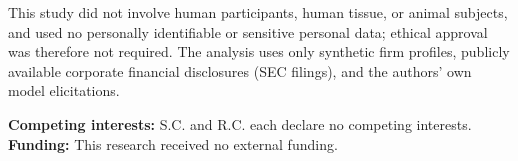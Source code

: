 \documentclass[pdflatex,sn-nature,lineno]{sn-jnl}
\theoremstyle{thmstyleone}
\begin{document}
This study did not involve human participants, human tissue, or animal subjects, and used no personally
identifiable or sensitive personal data; ethical approval was therefore not required. The analysis uses
only synthetic firm profiles, publicly available corporate financial disclosures (SEC filings), and the
authors' own model elicitations.

\noindent\textbf{Competing interests:} S.C. and R.C. each declare no competing interests.\\
\textbf{Funding:} This research received no external funding.
\end{document}
